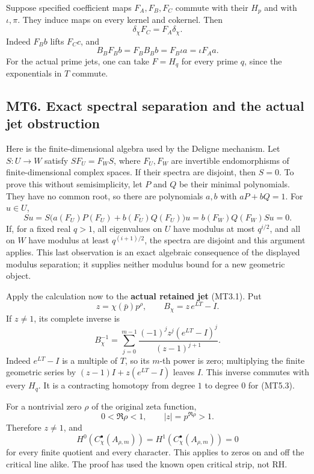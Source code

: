 Suppose specified coefficient maps \(F_A,F_B,F_C\) commute with their
\(H_p\) and with \(\iota,\pi\). They induce maps on every kernel and
cokernel. Then \[
 \delta_\chi F_C=F_A\delta_\chi.
\tag{MT5.8}
\] Indeed \(F_Bb\) lifts \(F_Cc\), and \[
 B_BF_Bb=F_BB_Bb=F_B\iota a=\iota F_Aa.
\] For the actual prime jets, one can take \(F=H_q\) for every prime
\(q\), since the exponentials in \(T\) commute.

\subsection{MT6. Exact spectral separation and the actual jet
obstruction}\label{mt6.-exact-spectral-separation-and-the-actual-jet-obstruction}

Here is the finite-dimensional algebra used by the Deligne mechanism.
Let \(S:U\to W\) satisfy \(SF_U=F_WS\), where \(F_U,F_W\) are invertible
endomorphisms of finite-dimensional complex spaces. If their spectra are
disjoint, then \(S=0\). To prove this without semisimplicity, let \(P\)
and \(Q\) be their minimal polynomials. They have no common root, so
there are polynomials \(a,b\) with \(aP+bQ=1\). For \(u\in U\), \[
 Su=S\bigl(a(F_U)P(F_U)+b(F_U)Q(F_U)\bigr)u
    =b(F_W)Q(F_W)Su=0.
\tag{MT6.1}
\] If, for a fixed real \(q>1\), all eigenvalues on \(U\) have modulus
at most \(q^{i/2}\), and all on \(W\) have modulus at least
\(q^{(i+1)/2}\), the spectra are disjoint and this argument applies.
This last observation is an exact algebraic consequence of the displayed
modulus separation; it supplies neither modulus bound for a new
geometric object.

Apply the calculation now to the \textbf{actual retained jet} (MT3.1).
Put \[
 z=\chi(\bar p)p^\rho,\qquad
 B_\chi=z\,e^{LT}-I.
\tag{MT6.2}
\] If \(z\ne1\), its complete inverse is \[
 \boxed{
 B_\chi^{-1}=
 \sum_{j=0}^{m-1}
 \frac{(-1)^j z^j(e^{LT}-I)^j}{(z-1)^{j+1}}.
 }
\tag{MT6.3}
\] Indeed \(e^{LT}-I\) is a multiple of \(T\), so its \(m\)-th power is
zero; multiplying the finite geometric series by \((z-1)I+z(e^{LT}-I)\)
leaves \(I\). This inverse commutes with every \(H_q\). It is a
contracting homotopy from degree \(1\) to degree \(0\) for (MT5.3).

For a nontrivial zero \(\rho\) of the original zeta function, \[
 0<\Re\rho<1,\qquad |z|=p^{\Re\rho}>1.
\tag{MT6.4}
\] Therefore \(z\ne1\), and \[
 H^0(C_\chi^\bullet(A_{\rho,m}))
  =H^1(C_\chi^\bullet(A_{\rho,m}))=0
\tag{MT6.5}
\] for every finite quotient and every character. This applies to zeros
on and off the critical line alike. The proof has used the known open
critical strip, not RH.

